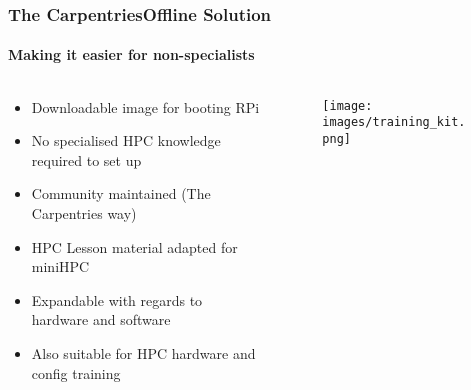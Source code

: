\begin{frame}
	\frametitle{The CarpentriesOffline Solution}
	\framesubtitle{Making it easier for non-specialists}
		
	\begin{columns}[c]
		\begin{column}{.65\linewidth}
			\begin{itemize}
				\item Downloadable image for booting RPi​
				\item No specialised HPC knowledge required to set up
				\item Community maintained (The Carpentries way)
				\item HPC Lesson material adapted for miniHPC
				\item Expandable with regards to hardware and software
				\item Also suitable for HPC hardware and config training
			\end{itemize}
		\end{column}
		
		\begin{column}[c]{.35\linewidth}
			\begin{figure}
				\texttt{[image: images/training\_kit.png]}
			\end{figure}
		\end{column}
	\end{columns}
 \end{frame}